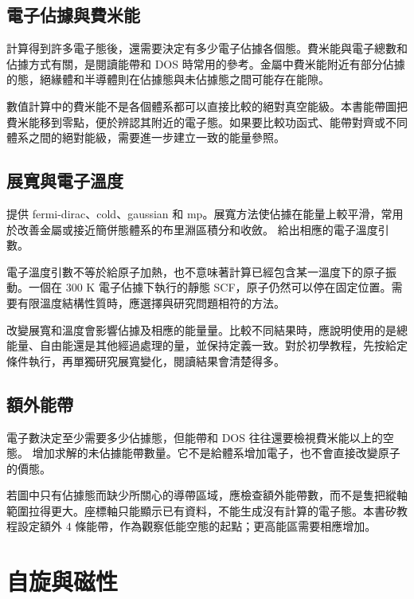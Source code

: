 \subsection{電子佔據與費米能}

計算得到許多電子態後，還需要決定有多少電子佔據各個態。費米能與電子總數和佔據方式有關，是閱讀能帶和 DOS 時常用的參考。金屬中費米能附近有部分佔據的態，絕緣體和半導體則在佔據態與未佔據態之間可能存在能隙。

數值計算中的費米能不是各個體系都可以直接比較的絕對真空能級。本書能帶圖把費米能移到零點，便於辨認其附近的電子態。如果要比較功函式、能帶對齊或不同體系之間的絕對能級，需要進一步建立一致的能量參照。

\subsection{展寬與電子溫度}

 提供 fermi-dirac、cold、gaussian 和 mp。展寬方法使佔據在能量上較平滑，常用於改善金屬或接近簡併態體系的布里淵區積分和收斂。 給出相應的電子溫度引數。

電子溫度引數不等於給原子加熱，也不意味著計算已經包含某一溫度下的原子振動。一個在 $300$ K 電子佔據下執行的靜態 SCF，原子仍然可以停在固定位置。需要有限溫度結構性質時，應選擇與研究問題相符的方法。

改變展寬和溫度會影響佔據及相應的能量量。比較不同結果時，應說明使用的是總能量、自由能還是其他經過處理的量，並保持定義一致。對於初學教程，先按給定條件執行，再單獨研究展寬變化，閱讀結果會清楚得多。

\subsection{額外能帶}

電子數決定至少需要多少佔據態，但能帶和 DOS 往往還要檢視費米能以上的空態。 增加求解的未佔據能帶數量。它不是給體系增加電子，也不會直接改變原子的價態。

若圖中只有佔據態而缺少所關心的導帶區域，應檢查額外能帶數，而不是隻把縱軸範圍拉得更大。座標軸只能顯示已有資料，不能生成沒有計算的電子態。本書矽教程設定額外 $4$ 條能帶，作為觀察低能空態的起點；更高能區需要相應增加。

\section{自旋與磁性}

